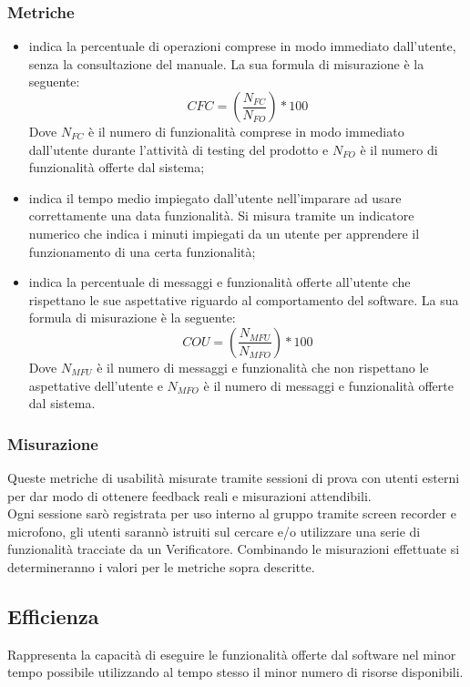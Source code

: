 \documentclass[PianoDiQualifica.tex]{subfiles}
\begin{document}
\subsubsection{Metriche}
\begin{itemize}
	\item {} indica la percentuale di operazioni comprese in modo immediato dall'utente, senza la consultazione del manuale. La sua formula di misurazione è la seguente: \[CFC=(\frac{N_{FC}}{N_{FO}})*100\] Dove $ N_{FC} $ è il numero di funzionalità comprese in modo immediato dall'utente durante l'attività di testing del prodotto e $ N_{FO} $ è il numero di funzionalità offerte dal sistema;
	\item {} indica il tempo medio impiegato dall'utente nell'imparare ad usare correttamente una data funzionalità. Si misura tramite un indicatore numerico che indica i minuti impiegati da un utente per apprendere il funzionamento di una certa funzionalità;
	\item {} indica la percentuale di messaggi e funzionalità offerte all'utente che rispettano le sue aspettative riguardo al comportamento del software. La sua formula di misurazione è la seguente: \[COU=(\frac{N_{MFU}}{N_{MFO}})*100\] Dove $ N_{MFU} $ è il numero di messaggi e funzionalità che non rispettano le aspettative dell'utente e $ N_{MFO} $ è il numero di messaggi e funzionalità offerte dal sistema.	
\end{itemize}	
\subsubsection{Misurazione}
Queste metriche di usabilità misurate tramite sessioni di prova con utenti esterni per dar modo di ottenere feedback reali e misurazioni attendibili.\\ Ogni sessione sarò registrata per uso interno al gruppo tramite screen recorder e microfono, gli utenti sarannò istruiti sul cercare e/o utilizzare una serie di funzionalità tracciate da un Verificatore.
Combinando le misurazioni effettuate si determineranno i valori per le metriche sopra descritte.

\subsection{Efficienza}
Rappresenta la capacità di eseguire le funzionalità offerte dal software nel minor tempo possibile utilizzando al tempo stesso il minor numero di risorse disponibili.
\end{document}
